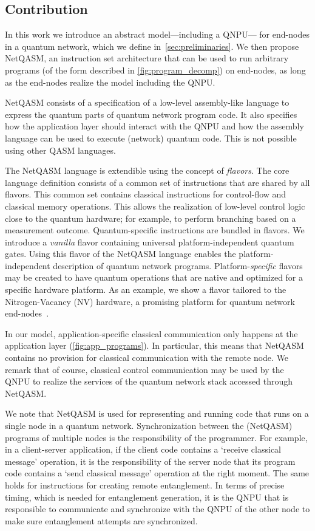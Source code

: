 \subsection{Contribution}
In this work we introduce an abstract model---including a \ac{QNPU}--- for end-nodes in a quantum network, which we define in~\cref{sec:preliminaries}.
We then propose \ac{NetQASM}, an instruction set architecture that can be used to run arbitrary programs (of the form described in \cref{fig:program_decomp}) on end-nodes, as long as the end-nodes realize the model including the QNPU.

\ac{NetQASM} consists of a specification of a low-level assembly-like language to express the quantum parts of quantum network program code.
It also specifies how the application layer should interact with the \ac{QNPU} and how the assembly language can be used to execute (network) quantum code.
This is not possible using other QASM languages.

The \ac{NetQASM} language is extendible using the concept of \textit{flavors}.
The core language definition consists of a common set of instructions that are shared by all flavors.
This common set contains classical instructions for control-flow and classical memory operations.
This allows the realization of low-level control logic close to the quantum hardware;
for example, to perform branching based on a measurement outcome.
Quantum-specific instructions are bundled in flavors.
We introduce a \textit{vanilla} flavor containing universal platform-independent quantum gates.
Using this flavor of the \ac{NetQASM} language enables the platform-independent description of quantum network programs.
Platform-\textit{specific} flavors may be created to have quantum operations that are native and optimized for a specific hardware platform.
As an example, we show a flavor tailored to the Nitrogen-Vacancy (NV) hardware, a promising platform for quantum network end-nodes~\cite{Taminiau2014, hanson2021realization}.

In our model, application-specific classical communication only happens at the application layer (\cref{fig:app_programs}).
In particular, this means that \ac{NetQASM} contains no provision for classical communication with the remote node.
We remark that of course, classical control communication may be used by the \ac{QNPU} to realize the services of the quantum network stack accessed through \ac{NetQASM}.

We note that \ac{NetQASM} is used for representing and running code that runs on a single node in a quantum network.
Synchronization between the (\ac{NetQASM}) programs of multiple nodes is the responsibility of the programmer.
For example, in a client-server application, if the client code contains a `receive classical message' operation, it is the responsibility of the server node that its program code contains a `send classical message' operation at the right moment.
The same holds for instructions for creating remote entanglement.
In terms of precise timing, which is needed for entanglement generation, it is the \ac{QNPU} that is responsible to communicate and synchronize with the \ac{QNPU} of the other node to make sure entanglement attempts are synchronized.

